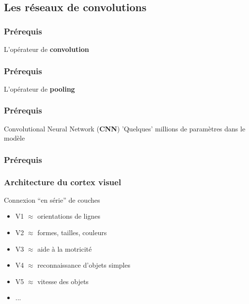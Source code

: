 \subsection{Les réseaux de convolutions}

\begin{frame}
  \frametitle{Prérequis}
  L'opérateur de \textbf{convolution}
\end{frame}

\begin{frame}
  \frametitle{Prérequis}
  L'opérateur de \textbf{pooling}
\end{frame}

\begin{frame}
  \frametitle{Prérequis}
  Convolutional Neural Network (\textbf{CNN})
  'Quelques' millions de paramètres dans le modèle
\end{frame}

\begin{frame}
  \frametitle{Prérequis}
\end{frame}

\begin{frame}
  \frametitle{Architecture du cortex visuel}
  \begin{minipage}[l]{0.55\linewidth}
  \end{minipage}\hfill
  \begin{minipage}[l]{0.44\linewidth}
    Connexion ``en série'' de couches
    \begin{itemize}
    \item V1 $\approx$ orientations de lignes
    \item V2 $\approx$ formes, tailles, couleurs
    \item V3 $\approx$ aide à la motricité
    \item V4 $\approx$ reconnaissance d'objets simples
    \item V5 $\approx$ vitesse des objets
    \item ...
    \end{itemize}
  \end{minipage}\hfill
\end{frame}
